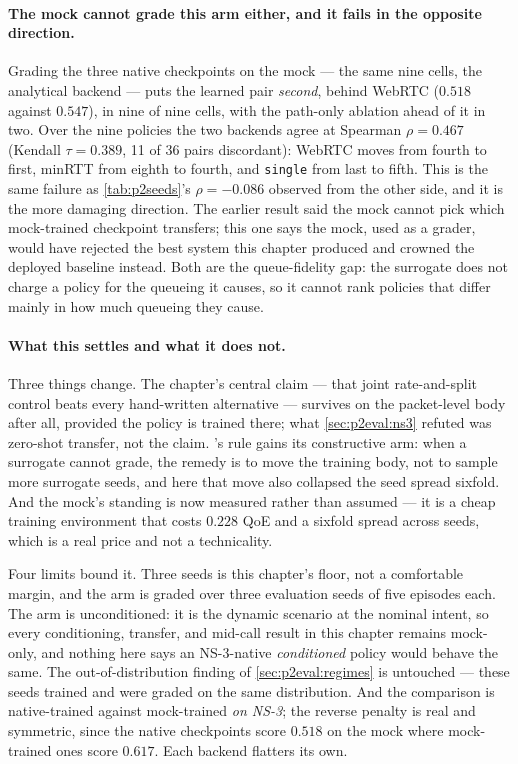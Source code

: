 \paragraph{The mock cannot grade this arm either, and it fails in the opposite direction.} Grading the
three native checkpoints on the mock --- the same nine cells, the analytical backend --- puts the
learned pair \emph{second}, behind WebRTC ($0.518$ against $0.547$), in nine of nine cells, with the
path-only ablation ahead of it in two. Over the nine policies the two backends agree at Spearman
$\rho = 0.467$ (Kendall $\tau = 0.389$, 11 of 36 pairs discordant): WebRTC moves from fourth to first,
minRTT from eighth to fourth, and \texttt{single} from last to fifth. This is the same failure as
\cref{tab:p2seeds}'s $\rho = -0.086$ observed from the other side, and it is the more damaging
direction. The earlier result said the mock cannot pick which mock-trained checkpoint transfers; this
one says the mock, used as a grader, would have rejected the best system this chapter produced and
crowned the deployed baseline instead. Both are the queue-fidelity gap: the surrogate does not charge a
policy for the queueing it causes, so it cannot rank policies that differ mainly in how much queueing
they cause.

\paragraph{What this settles and what it does not.} Three things change. The chapter's central claim ---
that joint rate-and-split control beats every hand-written alternative --- survives on the packet-level
body after all, provided the policy is trained there; what \cref{sec:p2eval:ns3} refuted was zero-shot
transfer, not the claim. 's rule gains its constructive arm: when a surrogate
cannot grade, the remedy is to move the training body, not to sample more surrogate seeds, and here that
move also collapsed the seed spread sixfold. And the mock's standing is now measured rather than
assumed --- it is a cheap training environment that costs $0.228$ QoE and a sixfold spread across seeds,
which is a real price and not a technicality.

Four limits bound it. Three seeds is this chapter's floor, not a comfortable margin, and the arm is
graded over three evaluation seeds of five episodes each. The arm is unconditioned: it is the dynamic
scenario at the nominal intent, so every conditioning, transfer, and mid-call result in this chapter
remains mock-only, and nothing here says an NS-3-native \emph{conditioned} policy would behave the same.
The out-of-distribution finding of \cref{sec:p2eval:regimes} is untouched --- these seeds trained and
were graded on the same distribution. And the comparison is native-trained against mock-trained
\emph{on NS-3}; the reverse penalty is real and symmetric, since the native checkpoints score $0.518$ on
the mock where mock-trained ones score $0.617$. Each backend flatters its own.

